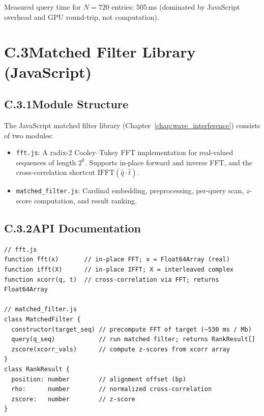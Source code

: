Measured query time for $N = 720$ entries: 505\,ms (dominated by JavaScript
overhead and GPU round-trip, not computation).

\section*{C.3\quad Matched Filter Library (JavaScript)}
\label{app:matched_filter}

\subsection*{C.3.1\quad Module Structure}

The JavaScript matched filter library (Chapter~\ref{chap:wave_interference})
consists of two modules:

\begin{itemize}
  \item \texttt{fft.js}: A radix-2 Cooley--Tukey FFT implementation for
        real-valued sequences of length $2^k$. Supports in-place forward
        and inverse FFT, and the cross-correlation shortcut
        $\mathrm{IFFT}(\overline{\hat{q}} \cdot \hat{t})$.
  \item \texttt{matched\_filter.js}: Cardinal embedding, preprocessing,
        per-query scan, $z$-score computation, and result ranking.
\end{itemize}

\subsection*{C.3.2\quad API Documentation}

\begin{verbatim}
// fft.js
function fft(x)       // in-place FFT; x = Float64Array (real)
function ifft(X)      // in-place IFFT; X = interleaved complex
function xcorr(q, t)  // cross-correlation via FFT; returns Float64Array

// matched_filter.js
class MatchedFilter {
  constructor(target_seq) // precompute FFT of target (~530 ms / Mb)
  query(q_seq)            // run matched filter; returns RankResult[]
  zscore(xcorr_vals)      // compute z-scores from xcorr array
}
class RankResult {
  position: number        // alignment offset (bp)
  rho:      number        // normalized cross-correlation
  zscore:   number        // z-score
}
\end{verbatim}

